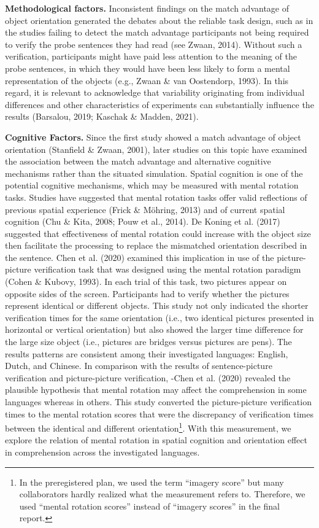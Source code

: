 \documentclass[
  man]{apa7}
\begin{document}
\textbf{Methodological factors.} Inconsistent findings on the match advantage of object orientation generated the debates about the reliable task design, such as in the studies failing to detect the match advantage participants not being required to verify the probe sentences they had read (see Zwaan, 2014). Without such a verification, participants might have paid less attention to the meaning of the probe sentences, in which they would have been less likely to form a mental representation of the objects (e.g., Zwaan \& van Oostendorp, 1993). In this regard, it is relevant to acknowledge that variability originating from individual differences and other characteristics of experiments can substantially influence the results (Barsalou, 2019; Kaschak \& Madden, 2021).

\textbf{Cognitive Factors.} Since the first study showed a match advantage of object orientation (Stanfield \& Zwaan, 2001), later studies on this topic have examined the association between the match advantage and alternative cognitive mechanisms rather than the situated simulation. Spatial cognition is one of the potential cognitive mechanisms, which may be measured with mental rotation tasks. Studies have suggested that mental rotation tasks offer valid reflections of previous spatial experience (Frick \& Möhring, 2013) and of current spatial cognition (Chu \& Kita, 2008; Pouw et al., 2014). De Koning et al. (2017) suggested that effectiveness of mental rotation could increase with the object size then facilitate the processing to replace the mismatched orientation described in the sentence. Chen et al. (2020) examined this implication in use of the picture-picture verification task that was designed using the mental rotation paradigm (Cohen \& Kubovy, 1993). In each trial of this task, two pictures appear on opposite sides of the screen. Participants had to verify whether the pictures represent identical or different objects. This study not only indicated the shorter verification times for the same orientation (i.e., two identical pictures presented in horizontal or vertical orientation) but also showed the larger time difference for the large size object (i.e., pictures are bridges versus pictures are pens). The results patterns are consistent among their investigated languages: English, Dutch, and Chinese. In comparison with the results of sentence-picture verification and picture-picture verification, -Chen et al. (2020) revealed the plausible hypothesis that mental rotation may affect the comprehension in some languages whereas in others. This study converted the picture-picture verification times to the mental rotation scores that were the discrepancy of verification times between the identical and different orientation\footnote{In the preregistered plan, we used the term ``imagery score'' but many collaborators hardly realized what the measurement refers to. Therefore, we used ``mental rotation scores'' instead of ``imagery scores'' in the final report.}. With this measurement, we explore the relation of mental rotation in spatial cognition and orientation effect in comprehension across the investigated languages.
\end{document}
